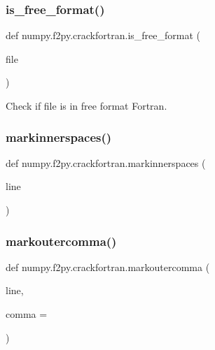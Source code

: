 \subsubsection{\texorpdfstring{is\+\_\+free\+\_\+format()}{is\_free\_format()}}
{\footnotesize\ttfamily def numpy.\+f2py.\+crackfortran.\+is\+\_\+free\+\_\+format (\begin{DoxyParamCaption}\item[{}]{file }\end{DoxyParamCaption})}

\begin{DoxyVerb}Check if file is in free format Fortran.\end{DoxyVerb}
 \mbox{\label{namespacenumpy_1_1f2py_1_1crackfortran_ab68799ac44d9ae463bfa70de63bd6ce7}} 
\subsubsection{\texorpdfstring{markinnerspaces()}{markinnerspaces()}}
{\footnotesize\ttfamily def numpy.\+f2py.\+crackfortran.\+markinnerspaces (\begin{DoxyParamCaption}\item[{}]{line }\end{DoxyParamCaption})}

\mbox{\label{namespacenumpy_1_1f2py_1_1crackfortran_a8d784dc1b55c70139e92e8c49004782f}} 
\subsubsection{\texorpdfstring{markoutercomma()}{markoutercomma()}}
{\footnotesize\ttfamily def numpy.\+f2py.\+crackfortran.\+markoutercomma (\begin{DoxyParamCaption}\item[{}]{line,  }\item[{}]{comma = {\ttfamily \textquotesingle{}} }\end{DoxyParamCaption})}

